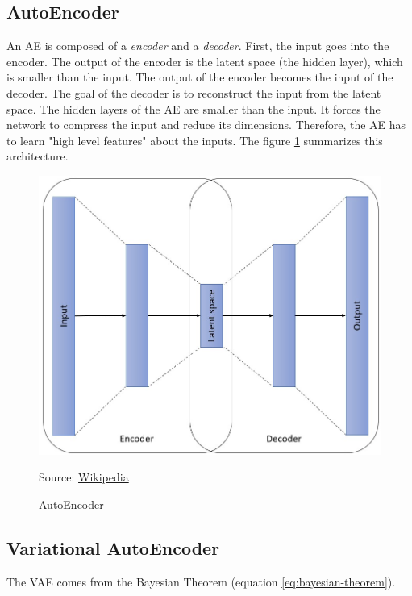 \documentclass[12pt]{report}
\begin{document}
\subsection{AutoEncoder}
\label{sec:back:ae}

An AE \cite{moor_topological_2020, tschannen_recent_2018, rudolph_structuring_2019} is composed of a \textit{encoder} and a \textit{decoder}.
First, the input goes into the encoder.
The output of the encoder is the latent space (the hidden layer), which is smaller than the input.
The output of the encoder becomes the input of the decoder.
The goal of the decoder is to reconstruct the input from the latent space.
The hidden layers of the AE are smaller than the input.
It forces the network to compress the input and reduce its dimensions.
Therefore, the AE has to learn "high level features" about the inputs.
The figure \ref{fig:autoencoder} summarizes this architecture.

\begin{figure}[H]
    \centering
    \includegraphics[width=0.9 \textwidth]{images/nn/architectures/autoencoder.jpg}
    \caption{AutoEncoder}
    Source: \href{https://commons.wikimedia.org/wiki/File:Autoencoder_structure.png}{Wikipedia}
    \label{fig:autoencoder}
\end{figure}

\subsection{Variational AutoEncoder}
\label{sec:back:vae}

The VAE \cite{doersch_tutorial_2016, noauthor_variational_nodate, noauthor_tutorial_nodate, akrami_robust_2019, liu_towards_2020} comes from the Bayesian Theorem (equation \ref{eq:bayesian-theorem}).
\end{document}
